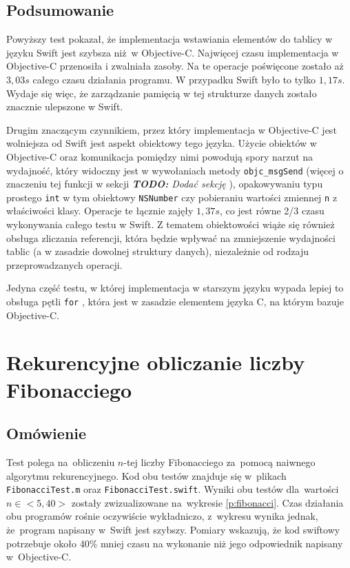 \documentclass[mgr, shortabstract]{iithesis}
\newcommand{\todo}[1]{
  \textit{\textbf{TODO: }#1}
}
\newcommand{\objcinline}[1]{
    \texttt{#1}
}
\begin{document}
\subsection{Podsumowanie}

Powyższy test pokazał, że implementacja wstawiania elementów do tablicy w języku Swift jest szybsza niż w Objective-C. Najwięcej czasu implementacja w Objective-C przenosiła i zwalniała zasoby. Na te operacje poświęcone zostało aż $3,03s$ całego czasu działania programu. W przypadku Swift było to tylko $1,17s$. Wydaje się więc, że zarządzanie pamięcią w tej strukturze danych zostało znacznie ulepszone w Swift.

Drugim znaczącym czynnikiem, przez który implementacja w Objective-C jest wolniejsza od Swift jest aspekt obiektowy tego języka. Użycie obiektów w Objective-C oraz komunikacja pomiędzy nimi powodują spory narzut na wydajność, który widoczny jest w wywołaniach metody \objcinline{objc_msgSend} (więcej o znaczeniu tej funkcji w sekcji \todo{Dodać sekcję}), opakowywaniu typu prostego \objcinline{int} w tym obiektowy \objcinline{NSNumber} czy pobieraniu wartości zmiennej \objcinline{n} z właściwości klasy. Operacje te łącznie zajęły $1,37s$, co jest równe 2/3 czasu wykonywania całego testu w Swift. Z tematem obiektowości wiąże się również obsługa zliczania referencji, która będzie wpływać na zmniejszenie wydajności tablic (a w zasadzie dowolnej struktury danych), niezależnie od rodzaju przeprowadzanych operacji.

Jedyna część testu, w której implementacja w starszym języku wypada lepiej to obsługa pętli \objcinline{for}, która jest w zasadzie elementem języka C, na którym bazuje Objective-C.

\section{Rekurencyjne obliczanie liczby Fibonacciego}
\label{s:fibonacci}

\subsection{Omówienie}

Test polega na~obliczeniu $n$-tej liczby Fibonacciego za~pomocą naiwnego algorytmu rekurencyjnego. Kod obu testów znajduje się w~plikach \texttt{FibonacciTest.m} oraz \texttt{FibonacciTest.swift}. Wyniki obu testów dla~wartości $n \in <5, 40>$ zostały zwizualizowane na~wykresie \ref{p:fibonacci}. Czas działania obu programów rośnie oczywiście wykładniczo, z~wykresu wynika jednak, że~program napisany w~Swift jest szybszy. Pomiary wskazują, że kod swiftowy potrzebuje około 40\% mniej czasu na wykonanie niż jego odpowiednik napisany w~Objective-C.
\end{document}
